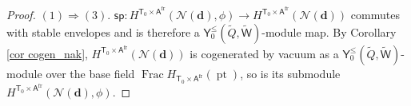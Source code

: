 \documentclass[10pt]{amsart}
\theoremstyle{definition}
\numberwithin{equation}{section}
\newcommand{\bv}{\mathbf{v}}
\newcommand{\bd}{\mathbf{d}}
\newcommand{\cN}{\mathcal{N}}
\newcommand{\sA}{\mathsf{A}}
\newcommand{\sT}{\mathsf{T}}
\newcommand{\sW}{\mathsf{W}}
\newcommand{\sw}{\mathsf{w}}
\newcommand{\Frac}{\operatorname{Frac}}
\newcommand{\Hom}{\operatorname{Hom}}
\newcommand{\pt}{\operatorname{pt}}
\newcommand{\Stab}{\operatorname{Stab}}
\newcommand{\id}{\operatorname{id}}
\begin{document}
\begin{proof}
$(1)\Longrightarrow(3)$. $\mathsf{sp}\colon H^{\sT_0\times \sA^{\mathrm{fr}}}(\cN(\bd),\phi)\to H^{\sT_0\times \sA^{\mathrm{fr}}}(\cN(\bd))$ commutes with stable envelopes and is therefore a $\mathsf Y_0^{\leqslant}(\widetilde Q,\widetilde{\sW})$-module map. By Corollary \ref{cor cogen_nak}, $H^{\sT_0\times \sA^{\mathrm{fr}}}(\cN(\bd))$ is cogenerated by vacuum as a $\mathsf Y_0^{\leqslant}(\widetilde Q,\widetilde{\sW})$-module over the base field $\Frac H_{\sT_0\times \sA^{\mathrm{fr}}}(\pt)$, so is its submodule $H^{\sT_0\times \sA^{\mathrm{fr}}}(\cN(\bd),\phi)$.

\end{proof}
\end{document}
